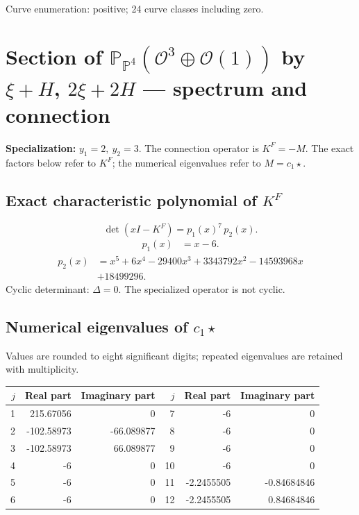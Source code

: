 \documentclass[10pt,a4paper]{article}
\begin{document}
Curve enumeration: positive; 24 curve classes including zero.
\clearpage\section*{Section of $\mathbb P_{\mathbb P^{4}}(\mathcal O^{3}\oplus \mathcal O(1))$ by $\xi +H$, $2\xi +2H$ --- spectrum and connection}
\textbf{Specialization:} $y_1=2,\ y_2=3$. The connection operator is $K^F=-M$. The exact factors below refer to $K^F$; the numerical eigenvalues refer to $M=c_1\star$.
\subsection*{Exact characteristic polynomial of $K^F$}
\[\det(xI-K^F)=p_{1}(x)^{7}\,p_{2}(x).\]
\[\begin{aligned}p_{1}(x)&=x - 6.\end{aligned}\]
\[\begin{aligned}p_{2}(x)&=x^{5} + 6 x^{4} - 29400 x^{3} + 3343792 x^{2} - 14593968 x\\&+18499296.\end{aligned}\]
Cyclic determinant: $\Delta=0$. The specialized operator is not cyclic.
\subsection*{Numerical eigenvalues of $c_1\star$}
Values are rounded to eight significant digits; repeated eigenvalues are retained with multiplicity.
\begin{center}\small\begin{tabular}{rrr@{\qquad}rrr}\toprule $j$ & Real part & Imaginary part & $j$ & Real part & Imaginary part\\\midrule
1 & 215.67056 & 0 & 7 & -6 & 0\\
2 & -102.58973 & -66.089877 & 8 & -6 & 0\\
3 & -102.58973 & 66.089877 & 9 & -6 & 0\\
4 & -6 & 0 & 10 & -6 & 0\\
5 & -6 & 0 & 11 & -2.2455505 & -0.84684846\\
6 & -6 & 0 & 12 & -2.2455505 & 0.84684846\\
\bottomrule\end{tabular}\end{center}
\end{document}
